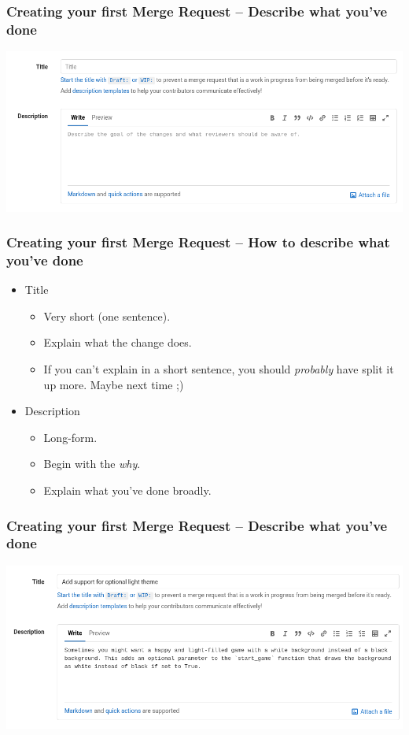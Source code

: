 \documentclass{beamer}
\begin{document}
\begin{frame}[fragile]
  \frametitle{Creating your first Merge Request -- Describe what you've done}
  \includegraphics[width=\linewidth]{merge-request/mr-create-01-empty.png}
\end{frame}

\begin{frame}
  \frametitle{Creating your first Merge Request -- How to describe what you've done}
  \begin{itemize}[<+->]
    \item Title
    \begin{itemize}[<+->]
      \item Very short (one sentence).
      \item Explain what the change does.
      \item If you can't explain in a short sentence, you should \emph{probably}
            have split it up more. Maybe next time ;)
    \end{itemize}
    \item Description
      \begin{itemize}[<+->]
        \item Long-form.
        \item Begin with the \emph{why}.
        \item Explain what you've done broadly.
      \end{itemize}
  \end{itemize}
\end{frame}

\begin{frame}[fragile]
  \frametitle{Creating your first Merge Request -- Describe what you've done}
  \includegraphics[width=\linewidth]{merge-request/mr-create-01-text.png}
\end{frame}
\end{document}
